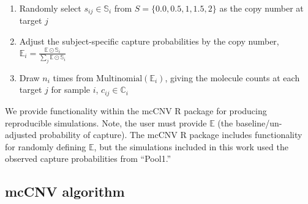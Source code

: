 \documentclass{bmcart}\usepackage[]{graphicx}\usepackage[]{color}
\begin{document}
\begin{enumerate}
  \item Randomly select $s_{ij} \in \mathbb{S}_i$ from $S = \{0.0, 0.5, 1, 1.5, 2\}$ as the copy number at target $j$
  \item Adjust the subject-specific capture probabilities by the copy number, $\mathbb{E}_i = \frac{\mathbb{E} \odot \mathbb{S}_{i}}{\sum_j \mathbb{E} \odot \mathbb{S}_{i}}$
  \item Draw $n_i$ times from $\text{Multinomial}(\mathbb{E}_i)$, giving the molecule counts at each target $j$ for sample $i$, $c_{ij} \in \mathbb{C}_i$
\end{enumerate}

We provide functionality within the mcCNV R package for producing reproducible simulations.
Note, the user must provide $\mathbb{E}$ (the baseline/un-adjusted probability of capture).
The mcCNV R package includes functionality for randomly defining $\mathbb{E}$, but the simulations included in this work used the observed capture probabilities from ``Pool1.''

\subsection{mcCNV algorithm}
\end{document}
